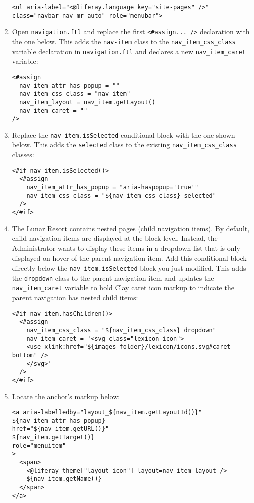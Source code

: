 \begin{enumerate}
\begin{verbatim}
<ul aria-label="<@liferay.language key="site-pages" />" class="navbar-nav mr-auto" role="menubar">
\end{verbatim}
\item
  Open \texttt{navigation.ftl} and replace the first
  \texttt{\textless{}\#assign...\ /\textgreater{}} declaration with the
  one below. This adds the \texttt{nav-item} class to the
  \texttt{nav\_item\_css\_class} variable declaration in
  \texttt{navigation.ftl} and declares a new \texttt{nav\_item\_caret}
  variable:

\begin{verbatim}
<#assign
  nav_item_attr_has_popup = ""
  nav_item_css_class = "nav-item"
  nav_item_layout = nav_item.getLayout()
  nav_item_caret = ""
/>
\end{verbatim}
\item
  Replace the \texttt{nav\_item.isSelected} conditional block with the
  one shown below. This adds the \texttt{selected} class to the existing
  \texttt{nav\_item\_css\_class} classes:

\begin{verbatim}
<#if nav_item.isSelected()>
  <#assign
    nav_item_attr_has_popup = "aria-haspopup='true'"
    nav_item_css_class = "${nav_item_css_class} selected"
  />
</#if>
\end{verbatim}
\item
  The Lunar Resort contains nested pages (child navigation items). By
  default, child navigation items are displayed at the block level.
  Instead, the Administrator wants to display these items in a dropdown
  list that is only displayed on hover of the parent navigation item.
  Add this conditional block directly below the
  \texttt{nav\_item.isSelected} block you just modified. This adds the
  \texttt{dropdown} class to the parent navigation item and updates the
  \texttt{nav\_item\_caret} variable to hold Clay caret icon markup to
  indicate the parent navigation has nested child items:

\begin{verbatim}
<#if nav_item.hasChildren()>
  <#assign
    nav_item_css_class = "${nav_item_css_class} dropdown"
    nav_item_caret = '<svg class="lexicon-icon">
    <use xlink:href="${images_folder}/lexicon/icons.svg#caret-bottom" />
    </svg>'
  />
</#if>
\end{verbatim}
\item
  Locate the anchor's markup below:

\begin{verbatim}
<a aria-labelledby="layout_${nav_item.getLayoutId()}" 
${nav_item_attr_has_popup} 
href="${nav_item.getURL()}" 
${nav_item.getTarget()} 
role="menuitem"
>
  <span>
    <@liferay_theme["layout-icon"] layout=nav_item_layout /> 
    ${nav_item.getName()}
  </span>
</a>
\end{verbatim}


\end{enumerate}
